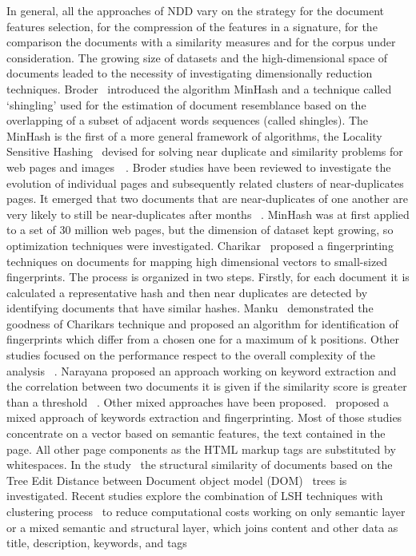 \documentclass{easychair}
\begin{document}
In general, all the approaches of NDD vary on the strategy for the document features selection, for the compression of the features in a signature, for the comparison the documents with a similarity measures and for the corpus under consideration. The growing size of datasets and the high-dimensional space of documents leaded to the necessity of investigating dimensionally reduction techniques. Broder~\cite{Broder:1997:SCW:283554.283370} introduced the algorithm MinHash and a technique called ‘shingling’ used for the estimation of document resemblance based on the overlapping of a subset of adjacent words sequences (called shingles). The MinHash is the first of a more general framework of algorithms, the Locality Sensitive Hashing~\cite{lsh} devised for solving near duplicate and similarity problems for web pages and images~\cite{Indyk:1998:ANN:276698.276876}~\cite{7840807}. Broder studies have been reviewed to investigate the evolution of individual pages and subsequently related clusters of near-duplicates pages. It emerged that two documents that are near-duplicates of one another are very likely to still be near-duplicates after months ~\cite{Fetterly:2003:ECN:951953.952397}. MinHash was at first applied to a set of 30 million web pages, but the dimension of dataset kept growing, so optimization techniques were investigated. 
Charikar~\cite{Charikar:2002:SET:509907.509965} proposed a fingerprinting techniques on documents for mapping high dimensional vectors to small-sized fingerprints. The process is organized in two steps. Firstly, for each document it is calculated a representative hash and then near duplicates are detected by identifying documents that have similar hashes. Manku~\cite{Manku:2007:DNW:1242572.1242592} demonstrated the goodness of Charikar\textquotesingle s  technique and proposed an algorithm for identification of fingerprints which differ from a chosen one for a maximum of k positions. Other studies focused on the performance respect to the overall complexity of the analysis ~\cite{key:article}. Narayana proposed an approach working on keyword extraction and the correlation between two documents it is given if the similarity score is greater than a threshold ~\cite{Narayana:2010:FTE:1947599.1947616}. Other mixed approaches have been proposed.~\cite{kumar2013near} proposed a mixed approach of keywords extraction and fingerprinting. Most of those studies concentrate on a vector based on semantic features, the text contained in the page. All other page components as the HTML markup tags are substituted by whitespaces. In the study~\cite{7785739} the structural similarity of documents based on the Tree Edit Distance between Document object model (DOM)~\cite{w3c} trees is investigated. Recent studies explore the combination of LSH techniques with clustering process~\cite{koga2007fast} to reduce computational costs working on only semantic layer or a mixed semantic and structural layer, which joins content and other data as title, description, keywords, and tags~\cite{7840807}
\end{document}
